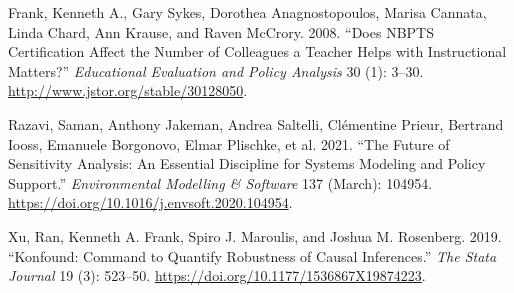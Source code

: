 \documentclass[
]{article}
\newlength{\cslhangindent}
\newlength{\cslentryspacingunit} %
\newenvironment{CSLReferences}[2] %
 {%
  \setlength{\parindent}{0pt}
  \ifodd #1
  \let\oldpar\par
  \def\par{\hangindent=\cslhangindent\oldpar}
  \fi
  \setlength{\parskip}{#2\cslentryspacingunit}
 }%
 {}
\begin{document}
\begin{CSLReferences}{1}{0}
\leavevmode{}%
Frank, Kenneth A., Gary Sykes, Dorothea Anagnostopoulos, Marisa Cannata,
Linda Chard, Ann Krause, and Raven McCrory. 2008. {``Does NBPTS
Certification Affect the Number of Colleagues a Teacher Helps with
Instructional Matters?''} \emph{Educational Evaluation and Policy
Analysis} 30 (1): 3--30. \url{http://www.jstor.org/stable/30128050}.

\leavevmode{}%
Razavi, Saman, Anthony Jakeman, Andrea Saltelli, Clémentine Prieur,
Bertrand Iooss, Emanuele Borgonovo, Elmar Plischke, et al. 2021. {``The
{Future} of {Sensitivity} {Analysis}: {An} Essential Discipline for
Systems Modeling and Policy Support.''} \emph{Environmental Modelling \&
Software} 137 (March): 104954.
\url{https://doi.org/10.1016/j.envsoft.2020.104954}.

\leavevmode{}%
Xu, Ran, Kenneth A. Frank, Spiro J. Maroulis, and Joshua M. Rosenberg.
2019. {``Konfound: Command to Quantify Robustness of Causal
Inferences.''} \emph{The Stata Journal} 19 (3): 523--50.
\url{https://doi.org/10.1177/1536867X19874223}.

\end{CSLReferences}
\end{document}
